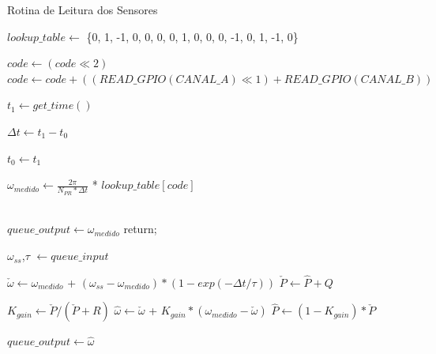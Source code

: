 \begin{algorithm}[H]
\caption{Rotina de Leitura dos Sensores}
\label{alg:rotina_leitura_sensores}
\begin{algorithmic}[1]
  \State $lookup\_table \gets $ \{0, 1, -1, 0, 0, 0, 0, 1, 0, 0, 0, -1, 0, 1, -1, 0\}

  \State $code \gets \left(code \ll 2\right)$ 
  \State $code \gets code + \left(\left(READ\_GPIO(CANAL\_A)\ll1\right)+READ\_GPIO(CANAL\_B)\right)$
    
  \State $t_1 \gets get\_time()$
  
  \State $\Delta{t} \gets  t_1 - t_0$
  
  \State $t_0 \gets t_1$
  
  \State $\omega_{medido} \gets \frac{2\pi}{N_{PR}*\Delta{t}}$ * $lookup\_table[code]$
  
  \\
    \State $queue\_output \gets \omega_{medido}$
    \State return;
  \EndIf
  
  \State $\omega_{ss}$,$\tau$ $\gets  queue\_input$

  \State $\check{\omega} \gets \omega_{medido}$ + $( \omega_{ss} - \omega_{medido} ) * (1 - exp(-\Delta{t}/\tau))$
  \State $\check{P} \gets \hat{P} + Q$


  \State $K_{gain} \gets \check{P} / (\check{P} + R)$
  \State $\hat{\omega} \gets \check{\omega}$ + $K_{gain} * (\omega_{medido} - \check{\omega})$
  \State $\hat{P} \gets (1 - K_{gain}) * \check{P}$ 
  
  \State $queue\_output \gets \hat{\omega}$
\end{algorithmic}
\end{algorithm}
